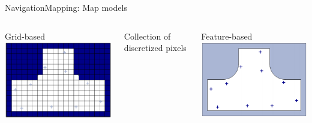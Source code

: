 \documentclass[10pt,compress]{beamer} %
\begin{document}
\begin{frame}{Navigation}{Mapping: Map models}
	\begin{center}
	\begin{columns}
	   	\begin{center}Grid-based\\\bigskip
		\includegraphics[width=\linewidth]{figs/grid.png}\\
		\end{center}
		Collection of discretized pixels
	   	\begin{center}Feature-based\\\bigskip
		\includegraphics[width=\linewidth]{figs/feature.png}\\

\end{center}
\end{columns}
\end{center}
\end{frame}
\end{document}
